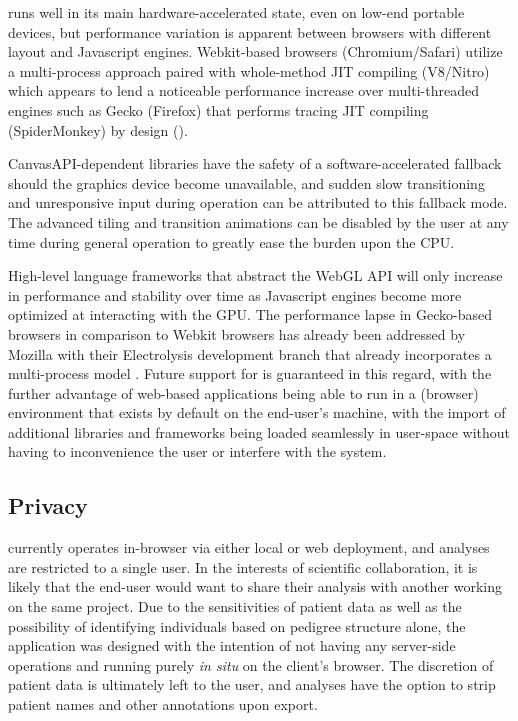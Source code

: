 \haplo runs well in its main hardware-accelerated state, even on low-end portable devices, but performance variation is apparent between browsers with different layout and Javascript engines. Webkit-based browsers (Chromium/Safari) utilize a multi-process approach paired with whole-method JIT compiling (V8/Nitro) which appears to lend a noticeable performance increase over multi-threaded engines such as Gecko (Firefox) that performs tracing JIT compiling (SpiderMonkey) by design (\citeauthor{v8,spidermonkey}). 

CanvasAPI-dependent libraries have the safety of a software-accelerated fallback should the graphics device become unavailable, and sudden slow transitioning and unresponsive input during \haplo operation can be attributed to this fallback mode. The advanced tiling and transition animations can be disabled by the user at any time during general operation to greatly ease the burden upon the CPU.

High-level language frameworks that abstract the WebGL API will only increase in performance and stability over time as Javascript engines become more optimized at interacting with the GPU. The performance lapse in Gecko-based browsers in comparison to Webkit browsers has already been addressed by Mozilla with their Electrolysis development branch that already incorporates a multi-process model \citep{firemulti}. Future support for \haplo is guaranteed in this regard, with the further advantage of web-based applications being able to run in a (browser) environment that exists by default on the end-user's machine, with the import of additional libraries and frameworks being loaded seamlessly in user-space without having to inconvenience the user or interfere with the system.



\subsection{Privacy}

\haplo currently operates in-browser via either local or web deployment, and analyses are restricted to a single user. In the interests of scientific collaboration, it is likely that the end-user would want to share their analysis with another working on the same project. Due to the sensitivities of patient data as well as the possibility of identifying individuals based on pedigree structure alone, the application was designed with the intention of not having any server-side operations and running purely \textit{in situ} on the client's browser. The discretion of patient data is ultimately left to the user, and analyses have the option to strip patient names and other annotations upon export.

